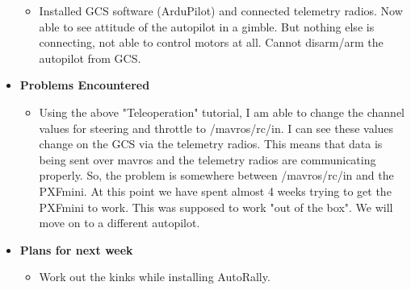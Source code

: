 \documentclass[compsoc,draftclsnofoot,onecolumn,10pt]{IEEEtran}
\begin{document}
\begin{itemize}
\begin{itemize}
        \item Installed GCS software (ArduPilot) and connected telemetry radios. Now able to see attitude of the autopilot in a gimble. But nothing else is connecting, not able to control motors at all. Cannot disarm/arm the autopilot from GCS.
    \end{itemize}

    \item {\textbf{Problems Encountered}}
    \begin{itemize}
        \item Using the above "Teleoperation" tutorial, I am able to change the channel values for steering and throttle to /mavros/rc/in. I can see these values change on the GCS via the telemetry radios. This means that data is being sent over mavros and the telemetry radios are communicating properly. So, the problem is somewhere between /mavros/rc/in and the PXFmini. At this point we have spent almost 4 weeks trying to get the PXFmini to work. This was supposed to work "out of the box". We will move on to a different autopilot.
    \end{itemize}

    \item{\textbf{Plans for next week}}
    \begin{itemize}
        \item Work out the kinks while installing AutoRally.
    \end{itemize}
\end{itemize}
\end{document}
